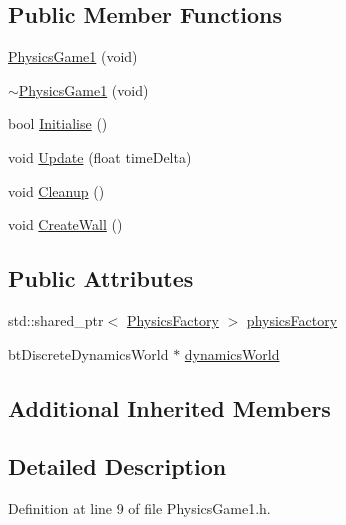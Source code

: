 \subsection*{Public Member Functions}
\begin{DoxyCompactItemize}
\item 
\hyperlink{class_b_g_e_1_1_physics_game1_a1bbfba9d483156d6664c00fef9fe07d0}{Physics\-Game1} (void)
\item 
\hyperlink{class_b_g_e_1_1_physics_game1_a2557f3c4f80f3b64d615cf30eaabc30a}{$\sim$\-Physics\-Game1} (void)
\item 
bool \hyperlink{class_b_g_e_1_1_physics_game1_a005afe565f5c60cd980493627b947802}{Initialise} ()
\item 
void \hyperlink{class_b_g_e_1_1_physics_game1_ae67a81b2bd9fda6538266bb86b3e37f5}{Update} (float time\-Delta)
\item 
void \hyperlink{class_b_g_e_1_1_physics_game1_a6bb436ec50bdc5f6ac0597b47896965e}{Cleanup} ()
\item 
void \hyperlink{class_b_g_e_1_1_physics_game1_a2b5f7b4ec3961a4ce5c79d5eb93c2c2a}{Create\-Wall} ()
\end{DoxyCompactItemize}
\subsection*{Public Attributes}
\begin{DoxyCompactItemize}
\item 
std\-::shared\-\_\-ptr$<$ \hyperlink{class_b_g_e_1_1_physics_factory}{Physics\-Factory} $>$ \hyperlink{class_b_g_e_1_1_physics_game1_a7c76051112cdab2e335c7a08e9c6a11c}{physics\-Factory}
\item 
bt\-Discrete\-Dynamics\-World $\ast$ \hyperlink{class_b_g_e_1_1_physics_game1_a619e4ce5159417c88e112f224a6bce13}{dynamics\-World}
\end{DoxyCompactItemize}
\subsection*{Additional Inherited Members}


\subsection{Detailed Description}


Definition at line 9 of file Physics\-Game1.\-h.



